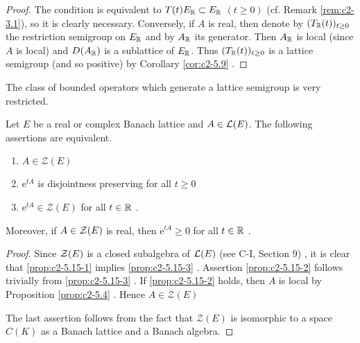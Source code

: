 \begin{proof}
The condition is equivalent to $T(t)E_{\mathbb{R}} \subset E_{\mathbb{R}}$ $(t \geq 0)$ (cf. Remark \ref{rem:c2-3.1}), so it is clearly necessary.
Conversely, if $A$ is real, then denote by $(T_{\mathbb{R}}(t))_{t \geq 0}$ the restriction semigroup on $E_{\mathbb{R}}$ and by $A_{\mathbb{R}}$ its generator.
Then $A_{\mathbb{R}}$ is local (since $A$ is local) and $D(A_{\mathbb{R}})$ is a sublattice of $E_{\mathbb{R}}$.
Thus $(T_{\mathbb{R}}(t))_{t \geq 0}$ is a lattice semigroup (and so positive) by Corollary \ref{cor:c2-5.9}  .
\end{proof}

The class of bounded operators which generate a lattice semigroup is very restricted.

\begin{proposition}\label{prop:c2-5.15}
Let $E$ be a real or complex Banach lattice and $A \in \mathcal{L}(E)$. 
The following assertions are equivalent.
\begin{enumerate}[\upshape (a)]
\item \label{prop:c2-5.15-1}
$A \in \mathcal{Z}(E)$
\item \label{prop:c2-5.15-2}
$\mathrm{e}^{tA}$ is disjointness preserving for all $t \geq 0$
\item \label{prop:c2-5.15-3}
$\mathrm{e}^{tA} \in \mathcal{Z}(E)$ for all $t \in \mathbb{R}$ .
\end{enumerate}
Moreover, if $A \in \mathcal{Z}(E)$ is real, then $\mathrm{e}^{tA} \geq 0$ for all $t \in \mathbb{R}$ .
\end{proposition}

\begin{proof}
Since $\mathcal{Z}(E)$ is a closed subalgebra of $\mathcal{L}(E)$ (see C-I, Section 9)
, it is clear that \ref{prop:c2-5.15-1}   implies \ref{prop:c2-5.15-3} .
Assertion \ref{prop:c2-5.15-2}  follows trivially from \ref{prop:c2-5.15-3}  .
If \ref{prop:c2-5.15-2}   holds, then $A$ is local by  Proposition \ref{prop:c2-5.4}  .
Hence $A \in \mathcal{Z}(E)$

The last assertion follows from the fact that $\mathcal{Z}(E)$ is isomorphic to a space $C(K)$ as a Banach lattice and a Banach algebra.
\end{proof}

